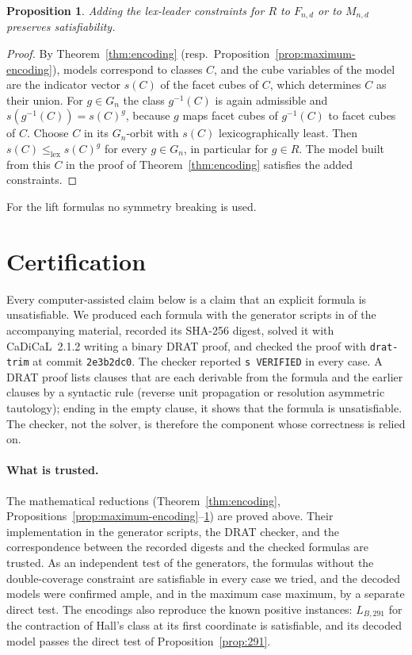 \documentclass[11pt]{article}
\numberwithin{equation}{section}
\newtheorem{proposition}[theorem]{Proposition}
\theoremstyle{definition}
\theoremstyle{remark}
\begin{document}
\begin{proposition}
\label{prop:lex-sound}
Adding the lex-leader constraints for \(R\) to \(F_{n,d}\) or to \(M_{n,d}\)
preserves satisfiability.
\end{proposition}

\begin{proof}
By Theorem~\ref{thm:encoding} (resp.\ Proposition~\ref{prop:maximum-encoding}),
models correspond to classes \(C\), and the cube variables of the model are
the indicator vector \(s(C)\) of the facet cubes of \(C\), which determines
\(C\) as their union.  For \(g\in G_n\) the class \(g^{-1}(C)\) is again
admissible and \(s(g^{-1}(C))=s(C)^g\), because \(g\) maps facet cubes of
\(g^{-1}(C)\) to facet cubes of \(C\).  Choose \(C\) in its \(G_n\)-orbit
with \(s(C)\) lexicographically least.  Then \(s(C)\le_{\mathrm{lex}}
s(C)^g\) for every \(g\in G_n\), in particular for \(g\in R\).  The model
built from this \(C\) in the proof of Theorem~\ref{thm:encoding}
satisfies the added constraints.
\end{proof}

For the lift formulas no symmetry breaking is used.

\section{Certification}
\label{sec:certification}

Every computer-assisted claim below is a claim that an explicit formula
is unsatisfiable.  We produced each formula with the generator scripts in
 of the accompanying material, recorded its SHA-256 digest,
solved it with CaDiCaL~2.1.2 \cite{BiereEtAl24CaDiCaL} writing a binary
DRAT proof, and checked the proof with \texttt{drat-trim}
\cite{WetzlerHeuleHunt14} at commit \texttt{2e3b2dc0}.  The checker
reported \texttt{s VERIFIED} in every case.  A DRAT proof lists clauses
that are each derivable from the formula and the earlier clauses by a
syntactic rule (reverse unit propagation or resolution asymmetric
tautology); ending in the empty clause, it shows that the formula is
unsatisfiable.  The checker, not the solver, is therefore the component
whose correctness is relied on.

\paragraph{What is trusted.}
The mathematical reductions (Theorem~\ref{thm:encoding},
Propositions~\ref{prop:maximum-encoding}--\ref{prop:lex-sound}) are proved
above.  Their implementation in the generator scripts, the DRAT checker, and
the correspondence between the recorded digests and the checked formulas
are trusted.  As an independent test of the generators, the formulas
without the double-coverage constraint are satisfiable in every case we
tried, and the decoded models were confirmed ample, and in the maximum
case maximum, by a separate direct test.  The encodings also reproduce the
known positive instances: \(L_{B,291}\) for the contraction of Hall's
class at its first coordinate is satisfiable, and its decoded model passes
the direct test of Proposition~\ref{prop:291}.
\end{document}
